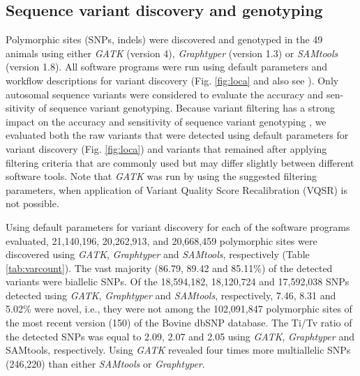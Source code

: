 \documentclass[../main.tex]{subfiles}
\begin{document}
\subsection*{Sequence variant discovery and genotyping}

Polymorphic  sites  (SNPs,  indels)  were  discovered  and  genotyped in the 49 animals using either \emph{GATK} (version 4), \emph{Graphtyper} (version  1.3)  or  \emph{SAMtools} (version  1.8). All software programs were run using default parameters and  workflow  descriptions  for  variant  discovery  (Fig. \ref{fig:loca} and  also  see ). Only autosomal sequence variants were considered  to  evaluate  the  accuracy  and  sen-sitivity  of sequence  variant genotyping. Because variant filtering has a strong impact on the accuracy and sensitivity of sequence variant genotyping \citep{carson2014effective,jun2015efficient}, we evaluated both  the  raw  variants  that  were  detected  using  default  parameters  for  variant  discovery  (Fig. \ref{fig:loca})  and  variants  that  remained  after  applying  filtering  criteria  that  are  commonly  used  but  may  differ  slightly  between  different software tools. Note that \emph{GATK} was run by using the suggested filtering parameters, when application of Variant Quality Score Recalibration (VQSR) is not possible.

Using default parameters for variant discovery for each of the software programs evaluated, 21,140,196, 20,262,913, and 20,668,459 polymorphic sites were discovered using \emph{GATK}, \emph{Graphtyper} and \emph{SAMtools}, respectively (Table \ref{tab:varcount}). The vast majority (86.79, 89.42 and 85.11\%) of the detected variants were biallelic SNPs. Of the 18,594,182, 18,120,724 and 17,592,038 SNPs detected using \emph{GATK},  \emph{Graphtyper} and \emph{SAMtools}, respectively, 7.46, 8.31 and 5.02\% were novel, i.e., they were not among the 102,091,847 polymorphic sites of the most recent version (150) of the Bovine dbSNP database. The Ti/Tv ratio of the detected SNPs was equal to 2.09, 2.07 and 2.05 using \emph{GATK}, \emph{Graphtyper} and SAMtools, respectively. Using \emph{GATK} revealed four times more multiallelic SNPs (246,220) than either \emph{SAMtools} or \emph{Graphtyper}.
\end{document}
